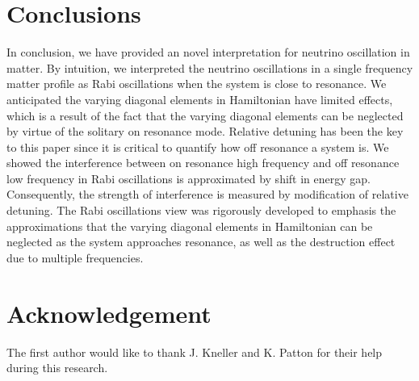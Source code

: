 \documentclass[%
reprint,
 amsmath,amssymb,
 aps,
]{revtex4-1}
\begin{document}
\section{\label{conclusions}Conclusions}



In conclusion, we have provided an novel interpretation for neutrino oscillation in matter. By intuition, we interpreted the neutrino oscillations in a single frequency matter profile as Rabi oscillations when the system is close to resonance. We anticipated the varying diagonal elements in Hamiltonian have limited effects, which is a result of the fact that the varying diagonal elements can be neglected by virtue of the solitary on resonance mode. Relative detuning has been the key to this paper since it is critical to quantify how off resonance a system is. We showed the interference between on resonance high frequency and off resonance low frequency in Rabi oscillations is approximated by shift in energy gap. Consequently, the strength of interference is measured by modification of relative detuning. The Rabi oscillations view was rigorously developed to emphasis the approximations that the varying diagonal elements in Hamiltonian can be neglected as the system approaches resonance, as well as the destruction effect due to multiple frequencies.








\section{\label{acknowledgement}Acknowledgement}

The first author would like to thank J. Kneller and K. Patton for their help during this research. 









\appendix
\end{document}

